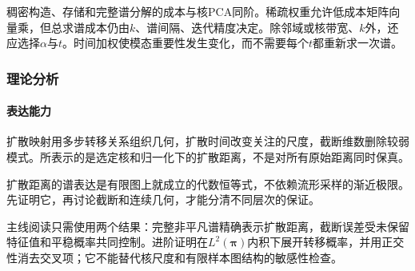 稠密构造、存储和完整谱分解的成本与核PCA同阶。稀疏权重允许低成本矩阵向量乘，但总求谱成本仍由$k$、谱间隔、迭代精度决定。除邻域或核带宽、$k$外，还应选择$\alpha$与$t$。时间加权使模态重要性发生变化，而不需要每个$t$都重新求一次谱。

\subsubsection{理论分析}
\label{sec:dim-diffusion-theory}

\paragraph{表达能力}
扩散映射用多步转移关系组织几何，扩散时间改变关注的尺度，截断维数删除较弱模式。所表示的是选定核和归一化下的扩散距离，不是对所有原始距离同时保真。

扩散距离的谱表达是有限图上就成立的代数恒等式，不依赖流形采样的渐近极限。先证明它，再讨论截断和连续几何，才能分清不同层次的保证。

主线阅读只需使用两个结果：完整非平凡谱精确表示扩散距离，截断误差受未保留特征值和平稳概率共同控制。进阶证明在$L^2(\bm{\pi})$内积下展开转移概率，并用正交性消去交叉项；它不能替代核尺度和有限样本图结构的敏感性检查。

